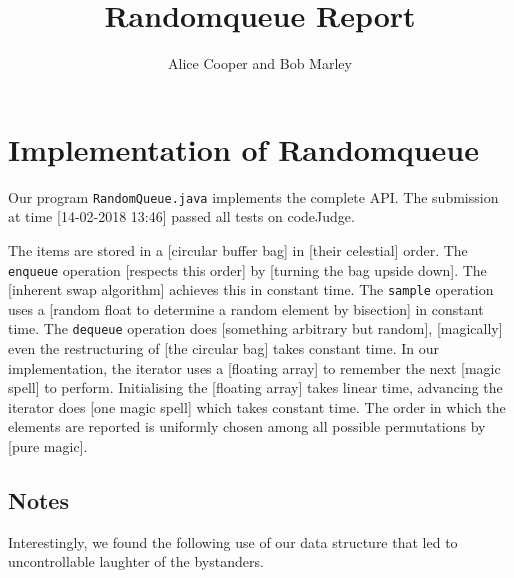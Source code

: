 \documentclass{tufte-handout}
\title{Randomqueue Report}
\author{Alice Cooper and Bob Marley}
\begin{document}
\maketitle
\thispagestyle{empty}

\section{Implementation of Randomqueue}


Our program \texttt{RandomQueue.java} implements the complete API.
The submission at time [14-02-2018 13:46] passed all tests on codeJudge.

The items are stored in a [circular buffer bag] in [their celestial] order.
The \texttt{enqueue} operation [respects this order] by [turning the bag upside down]. 
The [inherent swap algorithm] achieves this in constant time.
The \texttt{sample} operation uses a [random float to determine a random element by bisection] in constant time. 
The \texttt{dequeue} operation does [something arbitrary but random], [magically] even the restructuring of [the circular bag] takes constant time.
In our implementation, the iterator uses a [floating array] to remember the next [magic spell] to perform. 
Initialising the [floating array] takes linear time, advancing the iterator does [one magic spell] which takes constant time.
The order in which the elements are reported is uniformly chosen among all possible permutations by [pure magic].


\subsection{Notes}

Interestingly, we found the following use of our data structure that led to uncontrollable laughter of the bystanders.
\end{document}
